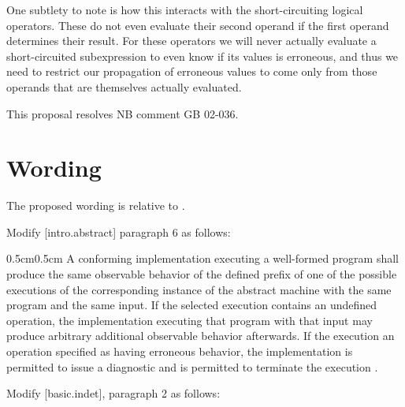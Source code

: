 One subtlety to note is how this interacts with the short-circuiting logical operators.  These do not even evaluate their second operand if the first operand determines their result.  For these operators we will never actually evaluate a short-circuited subexpression to even know if its values is erroneous, and thus we need to restrict our propagation of erroneous values to come only from those operands that are themselves actually evaluated.

This proposal resolves NB comment GB 02-036.

\section{Wording}

The proposed wording is relative to \cite{N5014}. 

Modify [intro.abstract] paragraph 6 as follows:

\begin{adjustwidth}{0.5cm}{0.5cm}
A conforming implementation executing a well-formed program shall produce the same observable behavior of the defined prefix of one of the possible executions of the corresponding instance of the abstract machine with the same program and the same input. If the selected execution contains an undefined operation, the implementation executing that program with that input may produce arbitrary additional observable behavior afterwards. If the execution  an operation specified as having erroneous behavior, the implementation is permitted to issue a diagnostic and is permitted to terminate the execution .
\end{adjustwidth}


Modify [basic.indet], paragraph 2 as follows:

